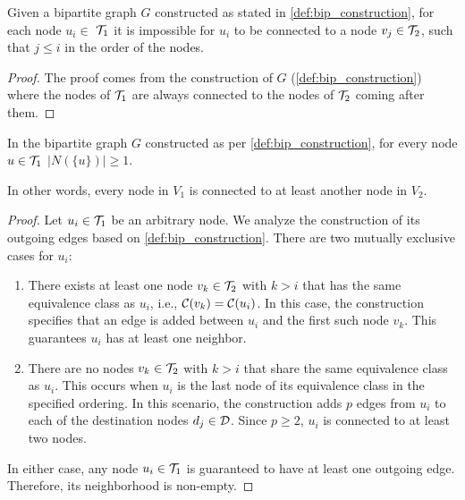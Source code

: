 \begin{lemma} \label{lemma:greater_nodes}
    Given a bipartite graph $G$ constructed as stated in \cref{def:bip_construction}, for each node $u_i \in$ $\mathcal{T}_{1}$ it is impossible for $u_i$ to be connected to a node $v_j \in \mathcal{T}_{2}$, such that $j \leq i$ in the order of the nodes.
\end{lemma}

\begin{proof}
    The proof comes from the construction of $G$ (\cref{def:bip_construction}) where the nodes of $\mathcal{T}_{1}$ are always connected to the nodes of $\mathcal{T}_{2}$ coming after them.
\end{proof}

\begin{lemma} \label{claim:node_connectivity}
    In the bipartite graph $G$ constructed as per \cref{def:bip_construction}, for every node $u \in \mathcal{T}_{1}$ $|N(\{u\})| \geq 1$.
\end{lemma}
In other words, every node in $V_1$ is connected to at least another node in $V_2$.
\begin{proof}
    Let $u_i \in \mathcal{T}_{1}$ be an arbitrary node. We analyze the construction of its outgoing edges based on \cref{def:bip_construction}. There are two mutually exclusive cases for $u_i$:
    \begin{enumerate}[leftmargin=25pt]
        \item There exists at least one node $v_k \in \mathcal{T}_{2}$ with $k > i$ that has the same equivalence class as $u_i$, i.e., $\mathcal{C}(v_k) = \mathcal{C}(u_i)$. In this case, the construction specifies that an edge is added between $u_i$ and the first such node $v_k$. This guarantees $u_i$ has at least one neighbor.
        \item There are no nodes $v_k \in \mathcal{T}_{2}$ with $k > i$ that share the same equivalence class as $u_i$. This occurs when $u_i$ is the last node of its equivalence class in the specified ordering. In this scenario, the construction adds $p$ edges from $u_i$ to each of the destination nodes $d_j \in \mathcal{D}$. Since $p \geq 2$, $u_i$ is connected to at least two nodes.
    \end{enumerate}
    In either case, any node $u_i \in \mathcal{T}_{1}$ is guaranteed to have at least one outgoing edge. Therefore, its neighborhood is non-empty.
\end{proof}

